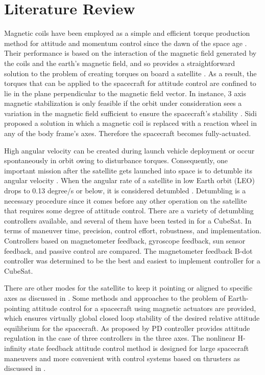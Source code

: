 \section{Literature Review}

Magnetic coils have been employed as a simple and efficient torque production method for attitude and momentum control since the dawn of the space age \cite{silani2005magnetic}. Their performance is based on the interaction of the magnetic field generated by the coils and the earth’s magnetic field, and so provides a straightforward solution to the problem of creating torques on board a satellite \cite{silani2005magnetic, wertz2012spacecraft}. As a result, the torques that can be applied to the spacecraft for attitude control are confined to lie in the plane perpendicular to the magnetic field vector. In instance, 3 axis magnetic stabilization is only feasible if the orbit under consideration sees a variation in the magnetic field sufficient to ensure the spacecraft's stability \cite{lovera2001periodic}. Sidi \cite{sidi1997spacecraft} proposed a solution in which a magnetic coil is replaced with a reaction wheel in any of the body frame’s axes. Therefore the spacecraft becomes fully-actuated.


High angular velocity can be created during launch vehicle deployment or occur spontaneously in orbit owing to disturbance torques. Consequently, one important mission after the satellite gets launched into space is to detumble its angular velocity \cite{yadav2020investigation}. When the angular rate of a satellite in low Earth orbit (LEO) drops to 0.13 degree/s or below, it is considered detumbled \cite{andresen2005attitude}. Detumbling is a necessary procedure since it comes before any other operation on the satellite that requires some degree of attitude control. There are a variety of detumbling controllers available, and several of them have been tested in \cite{pignede2014detumbling} for a CubeSat. In terms of maneuver time, precision, control effort, robustness, and implementation. Controllers based on magnetometer feedback, gyroscope feedback, sun sensor feedback, and passive control are compared. The magnetometer feedback B-dot controller was determined to be the best and easiest to implement controller for a CubeSat.


There are other modes for the satellite to keep it pointing or aligned to specific axes as discussed in \cite{markley2014fundamentals}.
Some methods and approaches to the problem of Earth-pointing attitude control for a spacecraft using magnetic actuators are provided, which ensures virtually global closed loop stability of the desired relative attitude equilibrium for the spacecraft. As proposed by \cite{silani2005magnetic, lovera2006global} PD controller provides attitude regulation in the case of three controllers in the three axes. The nonlinear H-infinity state feedback attitude control method is designed for large spacecraft maneuvers and more convenient with control systems based on thrusters as discussed in \cite{jonsson2019simulations}.

